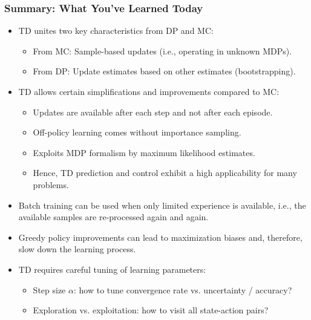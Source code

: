\begin{frame}
\frametitle{Summary: What You've Learned Today}
\begin{itemize}
	\item TD unites two key characteristics from DP and MC:
	\begin{itemize}
		\item From MC: Sample-based updates (i.e., operating in unknown MDPs).
		\item From DP: Update estimates based on other estimates (bootstrapping).
	\end{itemize}\pause
	\item TD allows certain simplifications and improvements compared to MC:
	\begin{itemize}
		\item Updates are available after each step and not after each episode.\pause
		\item Off-policy learning comes without importance sampling.\pause
		\item Exploits MDP formalism by maximum likelihood estimates. \pause
		\item Hence, TD prediction and control exhibit a high applicability for many problems.\pause
	\end{itemize}
	\item Batch training can be used when only limited experience is available, i.e., the available samples are re-processed again and again.\pause
	\item Greedy policy improvements can lead to maximization biases and, therefore, slow down the learning process. \pause
	\item TD requires careful tuning of learning parameters:
	\begin{itemize}
		\item Step size $\alpha$: how to tune convergence rate vs. uncertainty / accuracy?
		\item Exploration vs. exploitation: how to visit all state-action pairs?
	\end{itemize}
\end{itemize}
\end{frame}

